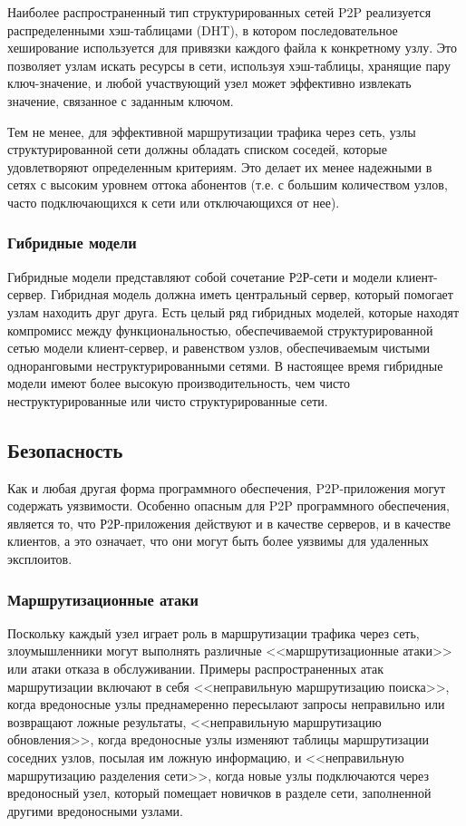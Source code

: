 \documentclass[bachelor, och, coursework]{SCWorks}
\begin{document}
Наиболее распространенный тип структурированных сетей P2P реализуется распределенными хэш-таблицами (DHT), 
в котором последовательное хеширование используется для привязки каждого файла к конкретному узлу. Это позволяет узлам искать ресурсы в сети, используя хэш-таблицы, хранящие пару ключ-значение, и любой участвующий узел может эффективно извлекать значение, связанное с заданным ключом.

Тем не менее, для эффективной маршрутизации трафика через сеть, узлы структурированной сети должны обладать списком соседей, которые удовлетворяют определенным критериям. 
Это делает их менее надежными в сетях с высоким уровнем оттока абонентов (т.е. с большим количеством узлов, 
часто подключающихся к сети или отключающихся от нее).

\subsubsection{Гибридные модели}
Гибридные модели представляют собой сочетание Р2Р-сети и модели клиент-сервер. 
Гибридная модель должна иметь центральный сервер, который помогает узлам находить друг друга. 
Есть целый ряд гибридных моделей, которые находят компромисс между функциональностью, обеспечиваемой структурированной сетью модели клиент-сервер, 
и равенством узлов, обеспечиваемым чистыми одноранговыми неструктурированными сетями. 
В настоящее время гибридные модели имеют более высокую производительность, чем чисто неструктурированные или чисто структурированные сети.

\subsection{Безопасность}
Как и любая другая форма программного обеспечения, P2P-приложения могут содержать уязвимости. 
Особенно опасным для P2P программного обеспечения, является то, что Р2Р-приложения действуют и в качестве серверов, и в качестве клиентов, а это означает, что они могут быть более уязвимы для удаленных эксплоитов.

\subsubsection{Маршрутизационные атаки}
Поскольку каждый узел играет роль в маршрутизации трафика через сеть, злоумышленники могут выполнять различные <<маршрутизационные атаки>> или атаки отказа в обслуживании. Примеры распространенных атак маршрутизации включают в себя <<неправильную маршрутизацию поиска>>, когда вредоносные узлы преднамеренно пересылают запросы неправильно или возвращают ложные результаты, <<неправильную маршрутизацию обновления>>, когда вредоносные узлы изменяют таблицы маршрутизации соседних узлов, посылая им ложную информацию, и <<неправильную маршрутизацию разделения сети>>, когда новые узлы подключаются через вредоносный узел, который помещает новичков в разделе сети, заполненной другими вредоносными узлами.
\end{document}
